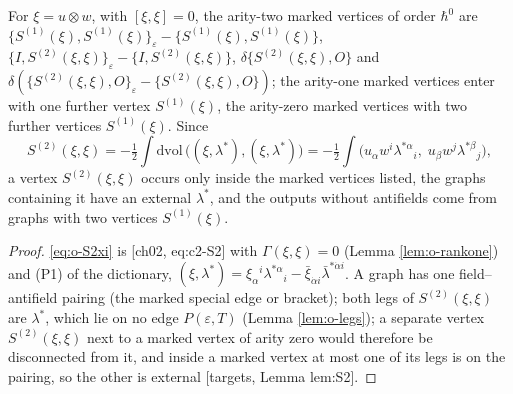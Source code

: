 \begin{proposition}
\label{prop:o-arity2}
For $\xi=u\otimes w$, with $[\xi,\xi]=0$, the arity-two marked vertices of order $\hbar^0$ are $\{S^{(1)}(\xi),S^{(1)}(\xi)\}_\varepsilon-\{S^{(1)}(\xi),S^{(1)}(\xi)\}$, $\{I,S^{(2)}(\xi,\xi)\}_\varepsilon-\{I,S^{(2)}(\xi,\xi)\}$, $\delta\{S^{(2)}(\xi,\xi),O\}$ and $\delta(\{S^{(2)}(\xi,\xi),O\}_\varepsilon-\{S^{(2)}(\xi,\xi),O\})$; the arity-one marked vertices enter with one further vertex $S^{(1)}(\xi)$, the arity-zero marked vertices with two further vertices $S^{(1)}(\xi)$. Since
\begin{equation}
S^{(2)}(\xi,\xi)=-\tfrac12\int\mathrm{dvol}\,\big((\xi,\lambda^*),(\xi,\lambda^*)\big)=-\tfrac12\int\big(u_\alpha w^i\lambda^{*\alpha}{}_i,\;u_\beta w^j\lambda^{*\beta}{}_j\big),
\label{eq:o-S2xi}
\end{equation}
a vertex $S^{(2)}(\xi,\xi)$ occurs only inside the marked vertices listed, the graphs containing it have an external $\lambda^*$, and the outputs without antifields come from graphs with two vertices $S^{(1)}(\xi)$.
\end{proposition}

\begin{proof}
\eqref{eq:o-S2xi} is [ch02, eq:c2-S2] with $\Gamma(\xi,\xi)=0$ (Lemma \ref{lem:o-rankone}) and (P1) of the dictionary, $(\xi,\lambda^*)=\xi_\alpha{}^i\lambda^{*\alpha}{}_i-\bar\xi_{\dot\alpha i}\bar\lambda^{*\dot\alpha i}$. A graph has one field--antifield pairing (the marked special edge or bracket); both legs of $S^{(2)}(\xi,\xi)$ are $\lambda^*$, which lie on no edge $P(\varepsilon,T)$ (Lemma \ref{lem:o-legs}); a separate vertex $S^{(2)}(\xi,\xi)$ next to a marked vertex of arity zero would therefore be disconnected from it, and inside a marked vertex at most one of its legs is on the pairing, so the other is external [targets, Lemma lem:S2].
\end{proof}

